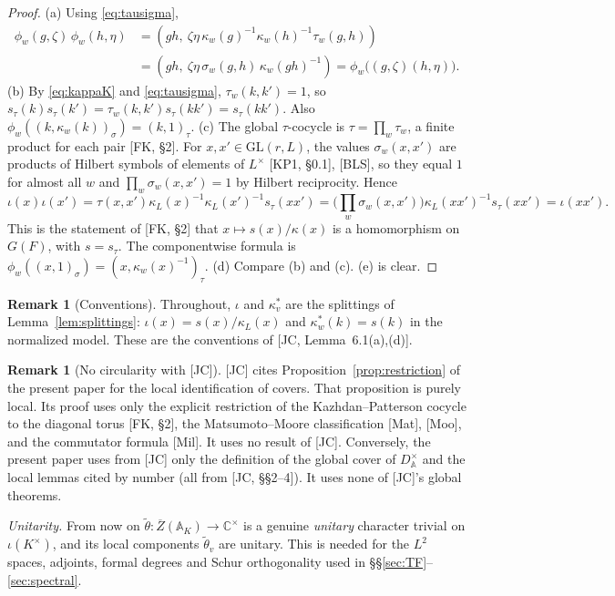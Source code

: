 \documentclass[12pt]{article}
\newcommand{\ov}[1]{\overline{#1}}
\newcommand{\A}{\mathbb{A}}
\newcommand{\C}{\mathbb{C}}
\newcommand{\GL}{\mathrm{GL}}
\newcommand{\Zb}{\ov{Z}}
\newcommand{\ks}{\kappa^{*}}
\theoremstyle{plain}
\theoremstyle{definition}
\newtheorem{remark}[theorem]{Remark}
\begin{document}
\begin{proof}
(a) Using \eqref{eq:tausigma},
\begin{align*} \phi_w(g,\zeta)\,\phi_w(h,\eta)&=(gh,\ \zeta\eta\,\kappa_w(g)^{-1}\kappa_w(h)^{-1}\tau_w(g,h))\\ &=(gh,\ \zeta\eta\,\sigma_w(g,h)\,\kappa_w(gh)^{-1})=\phi_w\big((g,\zeta)(h,\eta)\big). \end{align*}
(b) By \eqref{eq:kappaK} and \eqref{eq:tausigma}, $\tau_w(k,k')=1$, so $s_\tau(k)s_\tau(k')=\tau_w(k,k')s_\tau(kk')=s_\tau(kk')$. Also $\phi_w((k,\kappa_w(k))_\sigma)=(k,1)_\tau$.
(c) The global $\tau$-cocycle is $\tau=\prod_w\tau_w$, a finite product for each pair [FK, \S2]. For $x,x'\in\GL(r,L)$, the values $\sigma_w(x,x')$ are products of Hilbert symbols of elements of $L^\times$ [KP1, \S0.1], [BLS], so they equal $1$ for almost all $w$ and $\prod_w\sigma_w(x,x')=1$ by Hilbert reciprocity. Hence
\[ \iota(x)\iota(x')=\tau(x,x')\kappa_L(x)^{-1}\kappa_L(x')^{-1}s_\tau(xx')=\Big(\prod_w\sigma_w(x,x')\Big)\kappa_L(xx')^{-1}s_\tau(xx')=\iota(xx'). \]
This is the statement of [FK, \S2] that $x\mapsto s(x)/\kappa(x)$ is a homomorphism on $G(F)$, with $s=s_\tau$. The componentwise formula is $\phi_w((x,1)_\sigma)=(x,\kappa_w(x)^{-1})_\tau$.
(d) Compare (b) and (c). (e) is clear.
\end{proof}

\begin{remark}[Conventions]\label{rem:JCsplitting}
Throughout, $\iota$ and $\ks_v$ are the splittings of Lemma~\ref{lem:splittings}: $\iota(x)=s(x)/\kappa_L(x)$ and $\ks_w(k)=s(k)$ in the normalized model. These are the conventions of [JC, Lemma~6.1(a),(d)].
\end{remark}

\begin{remark}[No circularity with {[JC]}]\label{rem:nocirc}
[JC] cites Proposition~\ref{prop:restriction} of the present paper for the local identification of covers. That proposition is purely local. Its proof uses only the explicit restriction of the Kazhdan--Patterson cocycle to the diagonal torus [FK, \S2], the Matsumoto--Moore classification [Mat], [Moo], and the commutator formula [Mil]. It uses no result of [JC]. Conversely, the present paper uses from [JC] only the definition of the global cover of $D^\times_{\A}$ and the local lemmas cited by number (all from [JC, \S\S2--4]). It uses none of [JC]'s global theorems.
\end{remark}

\emph{Unitarity.} From now on $\tilde\theta:\Zb(\A_K)\to\C^\times$ is a genuine \emph{unitary} character trivial on $\iota(K^\times)$, and its local components $\tilde\theta_v$ are unitary. This is needed for the $L^2$ spaces, adjoints, formal degrees and Schur orthogonality used in \S\S\ref{sec:TF}--\ref{sec:spectral}.
\end{document}
